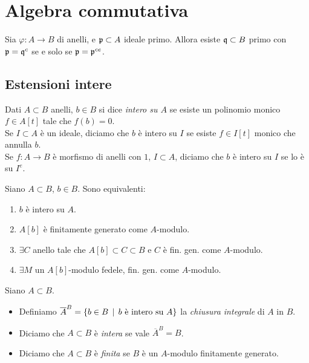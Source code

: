 \chapter{Algebra commutativa}

\begin{lemma}
    Sia $\varphi:A\to B$ di anelli, e $\mathfrak{p}\subset A$ ideale primo. Allora esiste $\mathfrak{q}\subset B$ primo con $\mathfrak{p}=\mathfrak{q}^c$ se e solo se $\mathfrak{p}=\mathfrak{p}^{ce}$.
\end{lemma}

\section{Estensioni intere}
\begin{definition}
 Dati $A\subset B$ anelli, $b\in B$ si dice \emph{intero su $A$} se esiste un polinomio monico $f\in A[t]$ tale che $f(b)=0$.\\
 Se $I\subset A$ è un ideale, diciamo che $b$ è intero su $I$ se esiste $f\in I[t]$ monico che annulla $b$.\\
 Se $f:A\to B$ è morfismo di anelli con $1$, $I\subset A$, diciamo che $b$ è intero su $I$ se lo è su $I^e$.
\end{definition}

\begin{proposition}
    Siano $A\subset B$, $b\in B$. Sono equivalenti:
    \begin{enumerate}
        \item $b$ è intero su $A$.
        \item $A[b]$ è finitamente generato come $A$-modulo.
        \item $\exists C$ anello tale che $A[b]\subset C \subset B$ e $C$ è fin. gen. come $A$-modulo.
        \item $\exists M$ un $A[b]$-modulo fedele, fin. gen. come $A$-modulo.
    \end{enumerate}
\end{proposition}

\begin{definition}
    Siano $A\subset B$.
    \begin{itemize}
        \item Definiamo $\overline{A}^B=\{ b\in B \operatorname{\; |\;} b \text{ è intero su } A \}$ la \emph{chiusura integrale} di $A$ in $B$.
        \item Diciamo che $A\subset B$ è \emph{intera} se vale $\overline{A}^B = B$.
        \item Diciamo che $A\subset B$ è \emph{finita} se $B$ è un $A$-modulo finitamente generato.
    \end{itemize}
\end{definition}


